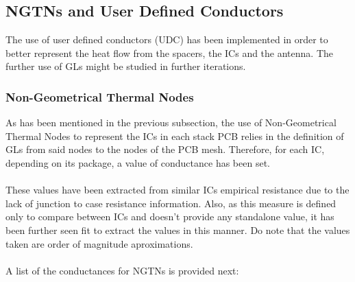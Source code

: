 \subsection{NGTNs and User Defined Conductors}

The use of user defined conductors (UDC) has been implemented in order to better
represent the heat flow from the spacers, the ICs and the antenna. The further use of GLs
might be studied in further iterations.

\subsubsection{Non-Geometrical Thermal Nodes}
As has been mentioned in the previous subsection, the use of Non-Geometrical Thermal Nodes to represent
the ICs in each stack PCB relies in the definition of GLs from said nodes to the nodes of the PCB mesh.
Therefore, for each IC, depending on its package, a value of conductance has been set.

\paragraph{}

These values have been extracted from similar ICs empirical resistance due to the lack of junction to case resistance information.
Also, as this measure is defined only to compare between ICs and doesn't provide any standalone value,
it has been further seen fit to extract the values in this manner. Do note that the values taken are order of magnitude
aproximations.

\paragraph{}

A list of the conductances for NGTNs is provided next:

